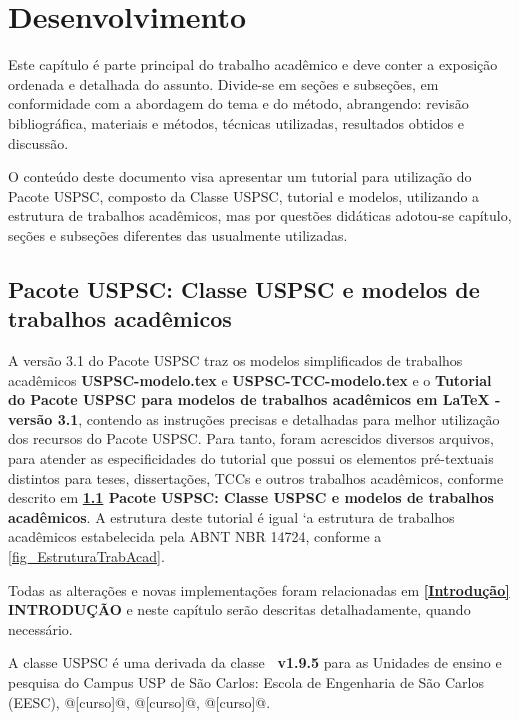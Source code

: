 

\chapter{Desenvolvimento}\label{cap_exemplos}
Este capítulo \'e parte principal do trabalho acad\^emico e deve conter a exposição ordenada e detalhada do assunto. Divide-se em seções e subseções, em conformidade com a abordagem do tema e do m\'etodo, abrangendo: revisão bibliogr\'afica, materiais e m\'etodos, t\'ecnicas utilizadas, resultados obtidos e discussão.

O conteúdo deste documento visa apresentar um tutorial para utilização do Pacote USPSC, composto da Classe USPSC, tutorial e modelos, utilizando a estrutura de trabalhos acad\^emicos, mas por questões did\'aticas adotou-se capítulo, seções e subseções diferentes das usualmente utilizadas.


\section{Pacote USPSC: Classe USPSC e modelos de trabalhos acad\^emicos}\label{Pacote}
A versão 3.1 do Pacote USPSC traz os modelos simplificados de trabalhos acad\^emicos \textbf{USPSC-modelo.tex} e \textbf{USPSC-TCC-modelo.tex} e o \textbf{Tutorial do Pacote USPSC para modelos de trabalhos acad\^emicos em LaTeX - vers\~ao 3.1}, contendo as instruções precisas e detalhadas para melhor utilização dos recursos do Pacote USPSC. Para tanto, foram acrescidos diversos arquivos, para atender as especificidades do tutorial que possui os elementos pr\'e-textuais distintos para teses, dissertações, TCCs e outros trabalhos acad\^emicos, conforme descrito em  \textbf{\ref{Pacote} Pacote USPSC: Classe USPSC e modelos de trabalhos acad\^emicos}. A estrutura deste tutorial \'e igual `a estrutura de trabalhos acad\^emicos estabelecida pela ABNT NBR 14724, conforme a \autoref{fig_EstruturaTrabAcad}.

Todas as alterações e novas implementações foram relacionadas em \textbf{\ref{Introdução} INTRODUÇÃO} e neste capítulo serão descritas detalhadamente, quando necess\'ario. 

A classe USPSC \'e uma derivada da classe \textbf{\abnTeX\ v1.9.5} para as Unidades de ensino e pesquisa do Campus USP de São Carlos:
Escola de Engenharia de São Carlos (EESC), @[curso]@, @[curso]@, @[curso]@.

